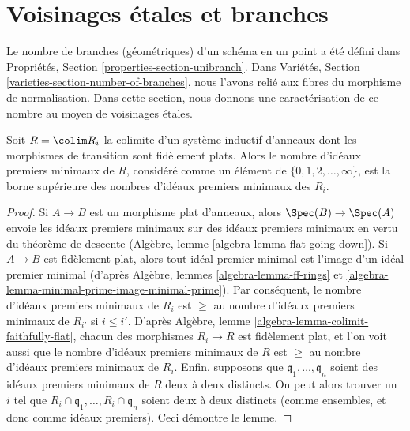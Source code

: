 \section{Voisinages \'etales et branches}
\label{section-etale-nbhds-branches}

\noindent
Le nombre de branches (géométriques) d'un schéma en un point a été
défini dans Propriétés, Section \ref{properties-section-unibranch}.
Dans Variétés, Section \ref{varieties-section-number-of-branches},
nous l'avons relié aux fibres du morphisme de normalisation.
Dans cette section, nous donnons une caractérisation de ce nombre au moyen de
voisinages \'etales.

\begin{lemma}
\label{lemma-nr-minimal-primes}
Soit $R = \colim R_i$ la colimite d'un système inductif d'anneaux
dont les morphismes de transition sont fidèlement plats.
Alors le nombre d'idéaux premiers minimaux de $R$,
considéré comme un élément de $\{0, 1, 2, \ldots, \infty\}$,
est la borne supérieure des nombres d'idéaux premiers minimaux des $R_i$.
\end{lemma}

\begin{proof}
Si $A \to B$ est un morphisme plat d'anneaux, alors $\Spec(B) \to \Spec(A)$
envoie les idéaux premiers minimaux sur des idéaux premiers minimaux en vertu du théorème de descente
(Algèbre, lemme \ref{algebra-lemma-flat-going-down}).
Si $A \to B$ est fidèlement plat, alors tout idéal premier
minimal est l'image d'un idéal premier minimal (d'après
Algèbre, lemmes \ref{algebra-lemma-ff-rings} et
\ref{algebra-lemma-minimal-prime-image-minimal-prime}).
Par conséquent, le nombre d'idéaux premiers minimaux de $R_i$ est
$\geq$ au nombre d'idéaux premiers minimaux de $R_{i'}$ si $i \leq i'$.
D'après Algèbre, lemme \ref{algebra-lemma-colimit-faithfully-flat},
chacun des morphismes $R_i \to R$ est
fidèlement plat, et l'on voit aussi que
le nombre d'idéaux premiers minimaux de $R$ est
$\geq$ au nombre d'idéaux premiers minimaux de $R_i$.
Enfin, supposons que $\mathfrak q_1, \ldots, \mathfrak q_n$
soient des idéaux premiers minimaux de $R$ deux à deux distincts. On peut alors
trouver un $i$ tel que $R_i \cap \mathfrak q_1, \ldots, R_i \cap \mathfrak q_n$
soient deux à deux distincts (comme ensembles, et donc comme idéaux premiers).
Ceci démontre le lemme.
\end{proof}

